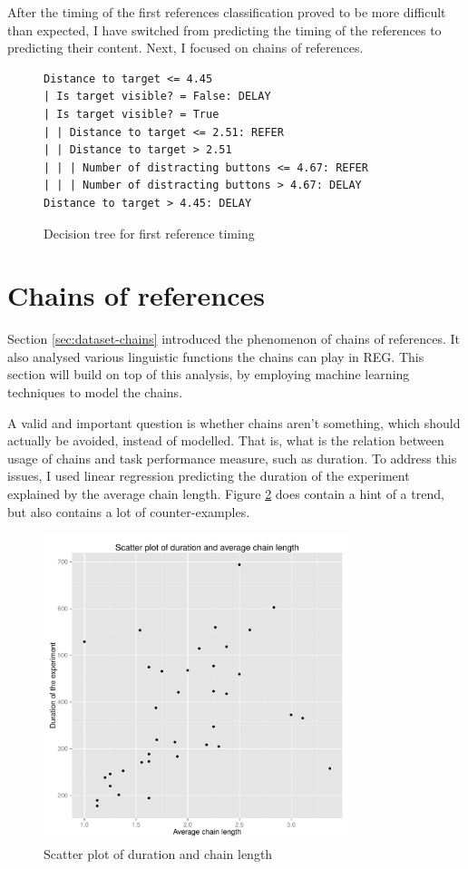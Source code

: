 After the timing of the first references classification proved to be more difficult than expected, I have switched from predicting the timing of the references to predicting their content. Next, I focused on chains of references.

\begin{figure}[!htbp]
 \centering
\small
\begin{verbatim}
Distance to target <= 4.45
| Is target visible? = False: DELAY
| Is target visible? = True
| | Distance to target <= 2.51: REFER
| | Distance to target > 2.51
| | | Number of distracting buttons <= 4.67: REFER
| | | Number of distracting buttons > 4.67: DELAY
Distance to target > 4.45: DELAY
\end{verbatim}
\caption{Decision tree for first reference timing}
\label{fig:dectree}
\end{figure}

\section{Chains of references}
Section \ref{sec:dataset-chains} introduced the phenomenon of chains of references. It also analysed various linguistic functions the chains can play in REG. This section will build on top of this analysis, by employing machine learning techniques to model the chains.

A valid and important question is whether chains aren't something, which should actually be avoided, instead of modelled. That is, what is the relation between usage of chains and task performance measure, such as duration. To address this issues, I used linear regression predicting the duration of the experiment explained by the average chain length. Figure \ref{fig:chains_dur_scatter} does contain a hint of a trend, but also contains a lot of counter-examples. 

\begin{figure}[!htbp]
  \centering
	\includegraphics[width=0.8\textwidth]{Images/chains_duration_LR}
	\caption{Scatter plot of duration and chain length}
	\label{fig:chains_dur_scatter}
\end{figure}

